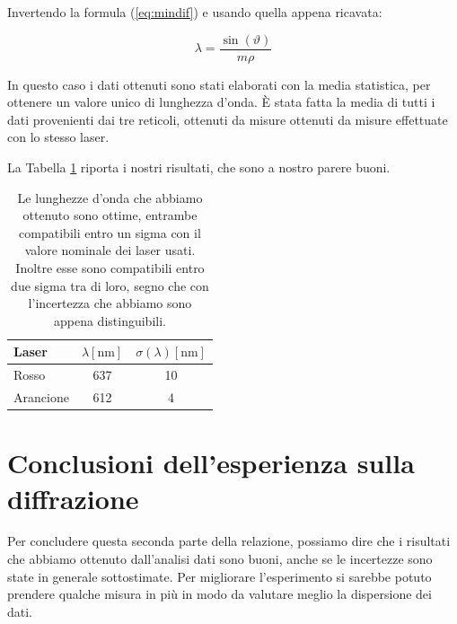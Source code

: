 Invertendo la formula (\ref{eq:mindif}) e usando quella appena ricavata:

\begin{equation}
    \lambda = \frac{\sin(\vartheta)}{m\rho}
\end{equation}

In questo caso i dati ottenuti sono stati elaborati con la media statistica, per ottenere un valore unico di lunghezza d'onda.
È stata fatta la media di tutti i dati provenienti dai tre reticoli, ottenuti da misure ottenuti da misure effettuate con lo stesso laser.

La Tabella \ref{tab:lambda} riporta i nostri risultati, che sono a nostro parere buoni.

\begin{table}[b!]
    \centering
    \begin{tabular}{l | c c}
        \toprule
        Laser & $\lambda [\si{\nano\metre}]$ & $\sigma(\lambda) [\si{\nano\metre}]$ \\
        \midrule
        Rosso & 637 & 10  \\
        Arancione & 612 & 4  \\
        \bottomrule
    \end{tabular}
    \caption{Le lunghezze d'onda che abbiamo ottenuto sono ottime, entrambe compatibili entro un sigma con
        il valore nominale dei laser usati. Inoltre esse sono compatibili entro due sigma tra di loro, segno che
        con l'incertezza che abbiamo sono appena distinguibili.}
    \label{tab:lambda}
\end{table}

\section{Conclusioni dell'esperienza sulla diffrazione}

Per concludere questa seconda parte della relazione, possiamo dire che i risultati che abbiamo ottenuto dall'analisi dati
sono buoni, anche se le incertezze sono state in generale sottostimate. Per migliorare l'esperimento si sarebbe potuto
prendere qualche misura in più in modo da valutare meglio la dispersione dei dati.
